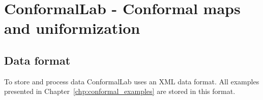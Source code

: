 \documentclass[Thesis.tex]{subfiles}
\begin{document}
\chapter{{\sc ConformalLab} - Conformal maps and uniformization}
\label{sec:conformallab}

\section{Data format}
To store and process data {\sc ConformalLab} uses an {\sc XML} data format.
All examples presented in Chapter~\ref{chp:conformal_examples} are stored
in this format.

\subfilebibliography
\end{document}
